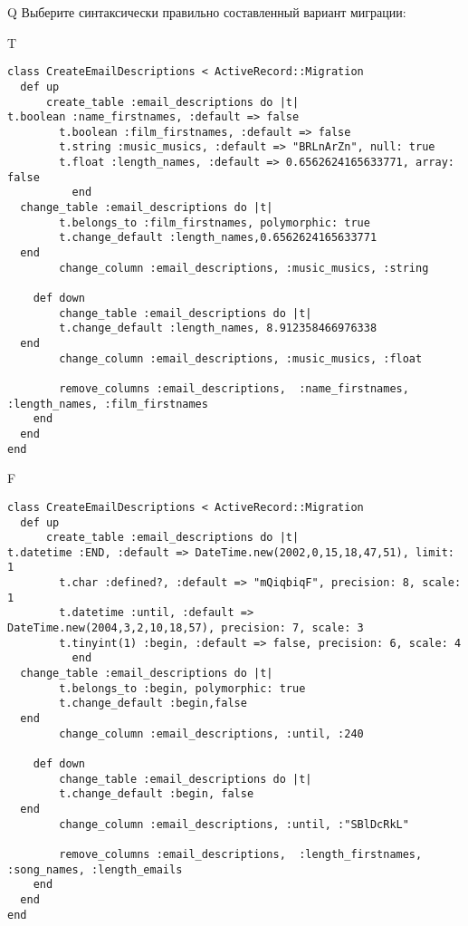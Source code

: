 Q
Выберите синтаксически правильно составленный вариант миграции:

T
\begin{verbatim}
class CreateEmailDescriptions < ActiveRecord::Migration
  def up
	  create_table :email_descriptions do |t|
t.boolean :name_firstnames, :default => false
		t.boolean :film_firstnames, :default => false
		t.string :music_musics, :default => "BRLnArZn", null: true
		t.float :length_names, :default => 0.6562624165633771, array: false
		  end
  change_table :email_descriptions do |t|
		t.belongs_to :film_firstnames, polymorphic: true
 		t.change_default :length_names,0.6562624165633771
  end
 		change_column :email_descriptions, :music_musics, :string
   
	def down
		change_table :email_descriptions do |t|
		t.change_default :length_names, 8.912358466976338
  end
 		change_column :email_descriptions, :music_musics, :float
   
		remove_columns :email_descriptions,  :name_firstnames, :length_names, :film_firstnames 
    end 
  end
end

\end{verbatim}

F
\begin{verbatim}
class CreateEmailDescriptions < ActiveRecord::Migration
  def up
	  create_table :email_descriptions do |t|
t.datetime :END, :default => DateTime.new(2002,0,15,18,47,51), limit: 1
		t.char :defined?, :default => "mQiqbiqF", precision: 8, scale: 1
		t.datetime :until, :default => DateTime.new(2004,3,2,10,18,57), precision: 7, scale: 3
		t.tinyint(1) :begin, :default => false, precision: 6, scale: 4
		  end
  change_table :email_descriptions do |t|
		t.belongs_to :begin, polymorphic: true
 		t.change_default :begin,false
  end
 		change_column :email_descriptions, :until, :240
   
	def down
		change_table :email_descriptions do |t|
		t.change_default :begin, false
  end
 		change_column :email_descriptions, :until, :"SBlDcRkL"
   
		remove_columns :email_descriptions,  :length_firstnames, :song_names, :length_emails 
    end 
  end
end

\end{verbatim}

